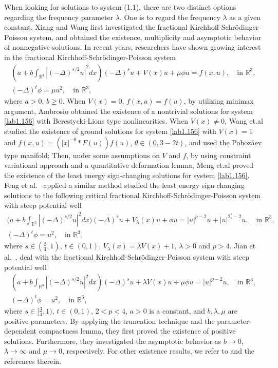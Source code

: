 \documentclass[11pt]{article}
\numberwithin{equation}{section}
\begin{document}
When looking for solutions to system (1.1), there are two distinct options  regarding  the frequency parameter  $\lambda$. One is to regard the frequency $\lambda$ as a given constant. Xiang and Wang \cite{H2998} first investigated  the  fractional  Kirchhoff-Schr\"odinger-Poisson system, and obtained the existence, multiplicity and asymptotic  behavior  of  nonnegative  solutions. In recent years, researchers have shown growing interest in the fractional Kirchhoff-Schr\"odinger-Poisson system
\begin{equation}\label{lab1.156}
\begin{gathered}
(a+b\int_{\mathbb{R}^3}|(-\Delta)^{s/2}u|^2dx)(-\Delta)^s u+V(x)u+\mu \phi u= f(x,u),   
\quad  \text{in }\mathbb{R}^3, \\
(-\Delta)^t \phi=\mu u^2, \quad   \text{in }\mathbb{R}^3,
\end{gathered}
\end{equation}
where $a>0$, $b\geq 0$. When $V(x)=0$, $f(x,u)=f(u)$, by utilizing minimax argument, 
Ambrosio \cite{A1111} obtained the existence of a nontrivial solutions  
for system \eqref{lab1.156} with Berestycki-Lions type nonlinearities. 
When   $V(x)\neq 0$, Wang et.al \cite{W1112} studied the existence of ground solutions 
for system \eqref{lab1.156} with  $V(x)=1$ and 
$f(x,u)=(|x|^{-\theta}\ast F(u))f(u)$, $\theta \in(0, 3-2t)$, and used the Pohoz\v{a}ev 
type  manifold; Then, under some assumptions on $V$ and $f$, by using constraint 
variational approach and a quantitative deformation lemma, Meng et.al \cite{M1113} 
proved the existence of  the least energy sign-changing solutions for system 
\eqref{lab1.156}.  Feng et al.\ \cite{F1114} applied a similar method studied the 
least energy sign-changing solutions to the following critical fractional 
Kirchhoff-Schr\"odinger-Poisson system with steep potential well
\begin{gather*}
\Big(a+b\int_{\mathbb{R}^3}|(-\Delta)^{s/2} u|^2dx\Big)
(-\Delta)^s u+V_{\lambda}(x)u+ \phi u=|u|^{p-2}u+|u|^{2^*_s-2}u, \quad
 \text{in }\mathbb{R}^3, \\
(-\Delta)^t \phi=u^2, \quad   \text{in }\mathbb{R}^3,
\end{gather*}
where $s\in(\frac{3}{4}, 1)$, $t\in(0,1)$, $V_\lambda(x)=\lambda V(x)+1$,
$\lambda>0$ and $p>4$.  Jian et al.\ \cite{J1115}, deal with the
fractional Kirchhoff-Schr\"odinger-Poisson system with steep potential well
\begin{gather*}
(a+b\int_{\mathbb{R}^3}|(-\Delta)^{s/2}u|^2dx)(-\Delta)^s u+\lambda V(x)u
 +\mu \phi u= |u|^{p-2}u,  \quad \text{in }\mathbb{R}^3, \\
(-\Delta)^t \phi= u^2, \quad   \text{in }\mathbb{R}^3,
\end{gather*}
where $s\in[\frac{3}{4}, 1)$, $t\in(0,1)$, $2<p<4$, $a>0$ is a constant, and
$b, \lambda, \mu$ are positive parameters. By applying the truncation technique and
the parameter-dependent compactness lemma, they first proved the existence of
positive solutions.  Furthermore, they investigated the   asymptotic behavior as
$b\to 0$, $\lambda \to \infty$ and $\mu \to 0$, respectively.
For other existence results, we refer to \cite{F1125, W1145, W1135}  and the
references therein.
\end{document}
